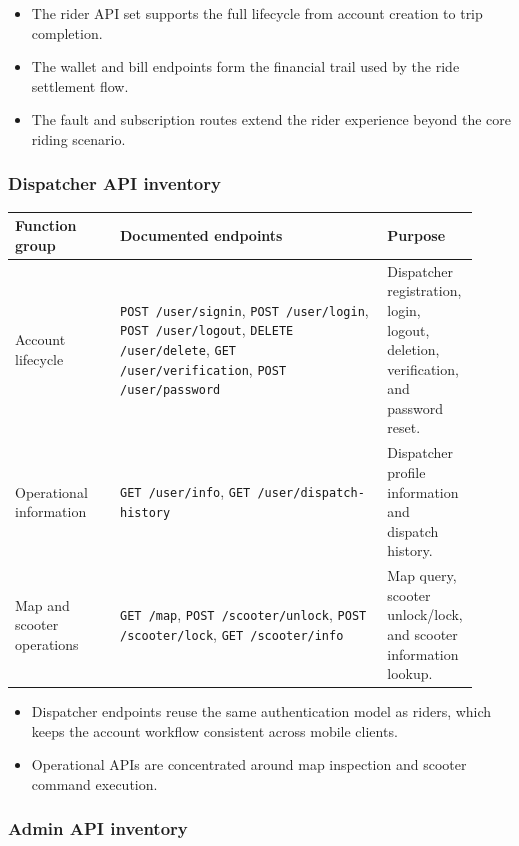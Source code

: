 \documentclass[12pt,a4paper]{article}
\begin{document}
\begin{itemize}
  \item The rider API set supports the full lifecycle from account creation to trip completion.
  \item The wallet and bill endpoints form the financial trail used by the ride settlement flow.
  \item The fault and subscription routes extend the rider experience beyond the core riding scenario.
\end{itemize}

\subsubsection{Dispatcher API inventory}

\begin{longtable}{p{0.22\linewidth} p{0.56\linewidth} p{0.14\linewidth}}
\toprule
\textbf{Function group} & \textbf{Documented endpoints} & \textbf{Purpose} \\
\midrule
\endhead
Account lifecycle & \texttt{POST /user/signin}, \texttt{POST /user/login}, \texttt{POST /user/logout}, \texttt{DELETE /user/delete}, \texttt{GET /user/verification}, \texttt{POST /user/password} & Dispatcher registration, login, logout, deletion, verification, and password reset. \\
Operational information & \texttt{GET /user/info}, \texttt{GET /user/dispatch-history} & Dispatcher profile information and dispatch history. \\
Map and scooter operations & \texttt{GET /map}, \texttt{POST /scooter/unlock}, \texttt{POST /scooter/lock}, \texttt{GET /scooter/info} & Map query, scooter unlock/lock, and scooter information lookup. \\
\bottomrule
\end{longtable}

\begin{itemize}
  \item Dispatcher endpoints reuse the same authentication model as riders, which keeps the account workflow consistent across mobile clients.
  \item Operational APIs are concentrated around map inspection and scooter command execution.
\end{itemize}

\subsubsection{Admin API inventory}
\end{document}
